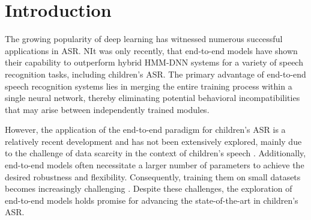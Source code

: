 \label{chap:e2e}
\cleardoublepage
\section{Introduction}
\label{chap:implement}
The growing popularity of deep learning has witnessed numerous successful applications in ASR. NIt was only recently, that end-to-end models have shown their capability to outperform hybrid HMM-DNN systems for a variety of speech recognition tasks, including children's ASR. The primary advantage of end-to-end speech recognition systems lies in merging the entire training process within a single neural network, thereby eliminating potential behavioral incompatibilities that may arise between independently trained modules.

However, the application of the end-to-end paradigm for children's ASR is a relatively recent development and has not been extensively explored, mainly due to the challenge of data scarcity in the context of children's speech \cite{gelin2021endtoend,sri_end2end,chen2020data,ng2020cuhk}. Additionally, end-to-end models often necessitate a larger number of parameters to achieve the desired robustness and flexibility. Consequently, training them on small datasets becomes increasingly challenging \cite{luscher2019rwth}. Despite these challenges, the exploration of end-to-end models holds promise for advancing the state-of-the-art in children's ASR.


